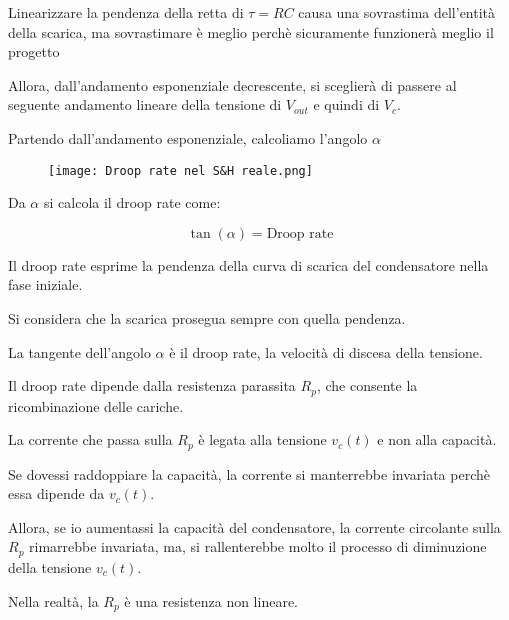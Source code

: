 \begin{tcolorbox} 
    Linearizzare la pendenza della retta di $\tau = RC$ causa una sovrastima dell'entità della scarica, 
    ma sovrastimare è meglio perchè sicuramente funzionerà meglio il progetto
\end{tcolorbox}

Allora, dall'andamento esponenziale decrescente, si sceglierà di passere al seguente andamento lineare della tensione di $V_{out}$ e quindi di $V_c$. \newline 

Partendo dall'andamento esponenziale, calcoliamo l'angolo $\alpha$

\begin{figure}[h]
    \centering
    \texttt{[image: Droop rate nel S\&H reale.png]}
\end{figure}

Da $\alpha$ si calcola il droop rate come: 

{
    \Large 
    \begin{equation}
        \tan(\alpha) = \text{Droop rate}
    \end{equation}
}

Il droop rate esprime la pendenza della curva di scarica del condensatore nella fase iniziale. \newline 

Si considera che la scarica prosegua sempre con quella pendenza. \newline 

La tangente dell'angolo $\alpha$ è il droop rate, la velocità di discesa della tensione. \newline 

Il droop rate dipende dalla resistenza parassita $R_p$, che consente la ricombinazione delle cariche. \newline 

La corrente che passa sulla $R_p$ è legata alla tensione $v_c(t)$ e non alla capacità. \newline 

Se dovessi raddoppiare la capacità, la corrente si manterrebbe invariata perchè essa dipende da $v_c (t)$. \newline 

Allora, se io aumentassi la capacità del condensatore, la corrente circolante sulla $R_p$ rimarrebbe invariata, 
ma, si rallenterebbe molto il processo di diminuzione della tensione $v_c(t)$. \newline 

Nella realtà, la $R_p$ è una resistenza non lineare. \newline 

